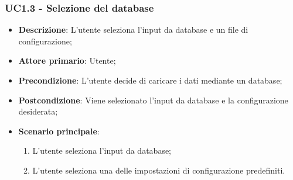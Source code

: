 \subsubsection{UC1.3 - Selezione del database}
\label{ssub:uc1.3}
\begin{itemize}
    \item \textbf{Descrizione}: L'utente seleziona l'input da database e un file di configurazione;
	
    \item \textbf{Attore primario}: Utente;
    
    \item \textbf{Precondizione}:   L'utente decide di caricare i dati mediante un database;
    \item \textbf{Postcondizione}:  Viene selezionato l'input da database e la configurazione desiderata;

	\item \textbf{Scenario principale}:
		\begin{enumerate}
			\item L'utente seleziona l'input da database;
			\item L'utente seleziona una delle impostazioni di configurazione predefiniti.
        \end{enumerate}

\end{itemize}
